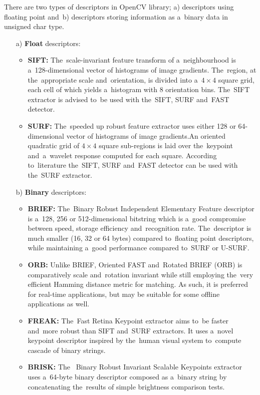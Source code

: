 There are two types of descriptors in OpenCV library; a) descriptors using floating point and~b) descriptors storing information as a~binary data in unsigned char type.
\begin{itemize}
	\item[a)] \textbf{Float} descriptors:
	
	\begin{itemize}
		\item \textbf{SIFT:} The~scale-invariant feature transform of a~neighbourhood is a~128-dimensional vector of histograms of image gradients. The~region, at the~appropriate scale and~orientation, is divided into a~$4\times 4$ square grid, each cell of which yields a~histogram with 8 orientation bins. The~SIFT extractor is advised to~be used with the~SIFT, SURF and~FAST detector.
		\item \textbf{SURF:} The~speeded up robust feature extractor uses either 128 or 64-dimensional vector of histograms of image gradients.An oriented quadratic grid of $4 \times 4$ square sub-regions is laid over the~keypoint and~a~wavelet response computed for each square. According to~literature the~SIFT, SURF and~FAST detector can be used with the~SURF extractor. \cite{www:sift_surf}
	\end{itemize}
	
	\item[b)] \textbf{Binary} descriptors:
	
	\begin{itemize}
		\item \textbf{BRIEF:} The~Binary Robust Independent Elementary Feature descriptor is a~128, 256 or 512-dimensional bitstring which is a~good compromise between speed, storage efficiency and~recognition rate. The~descriptor is much smaller (16, 32 or 64 bytes) compared to~floating point descriptors, while maintaining a~good performance compared to~SURF or U-SURF. \cite{article:brief}
		
		\item \textbf{ORB:} Unlike BRIEF, Oriented FAST and~Rotated BRIEF (ORB) is comparatively scale and~rotation invariant while still employing the~very efficient Hamming distance\cite{hamming_distance} metric for matching. As such, it is preferred for real-time applications, but may be suitable for some offline applications as well. \cite{www:orb}\cite{article:orb}
		
		\item \textbf{FREAK:} The~Fast Retina Keypoint extractor aims to~be faster and~more robust than SIFT and~SURF extractors. It uses a~novel keypoint descriptor inspired by the~human visual system to~compute cascade of binary strings.\cite{article:freak}
		
		\item \textbf{BRISK:}  The~ Binary Robust Invariant Scalable Keypoints extractor uses a~64-byte binary descriptor composed as a~binary string by concatenating the~results of simple brightness comparison tests. \cite{article:brisk}
	\end{itemize}
\end{itemize}

